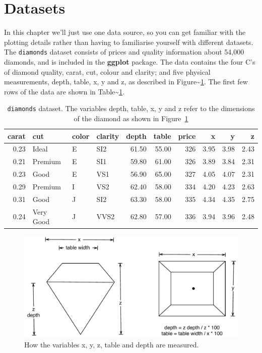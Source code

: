 \section{Datasets}\label{sec:data-sets}

In this chapter we'll just use one data source, so you can get familiar
with the plotting details rather than having to familiarise yourself
with different datasets. The \texttt{diamonds} dataset consists of
prices and quality information about 54,000 diamonds, and is included in
the \textbf{ggplot} package. The data contains the four C's of diamond
quality, carat, cut, colour and clarity; and five physical measurements,
depth, table, x, y and z, as described in
Figure\textasciitilde{}\ref{fig:diamond-dim}. The first few rows of the
data are shown in Table\textasciitilde{}\ref{tbl:diamonds}.

\begin{table}[ht]
\centering
\begin{tabular}{rlllrrrrrr}
  \hline
carat & cut & color & clarity & depth & table & price & x & y & z \\ 
  \hline
0.23 & Ideal & E & SI2 & 61.50 & 55.00 & 326 & 3.95 & 3.98 & 2.43 \\ 
  0.21 & Premium & E & SI1 & 59.80 & 61.00 & 326 & 3.89 & 3.84 & 2.31 \\ 
  0.23 & Good & E & VS1 & 56.90 & 65.00 & 327 & 4.05 & 4.07 & 2.31 \\ 
  0.29 & Premium & I & VS2 & 62.40 & 58.00 & 334 & 4.20 & 4.23 & 2.63 \\ 
  0.31 & Good & J & SI2 & 63.30 & 58.00 & 335 & 4.34 & 4.35 & 2.75 \\ 
  0.24 & Very Good & J & VVS2 & 62.80 & 57.00 & 336 & 3.94 & 3.96 & 2.48 \\ 
   \hline
\end{tabular}
\caption{\texttt{diamonds} dataset.  The variables depth, table, x, y and z refer to the dimensions of the diamond as shown in Figure~\ref{fig:diamond-dim}} 
\label{tbl:diamonds}
\end{table}

\begin{figure}[htbp]
  \centering
    \includegraphics[width=0.8\linewidth]{diagrams/diamond-dimensions}
  \caption{How the variables x, y, z, table and depth are measured.}
  \label{fig:diamond-dim}
\end{figure}

